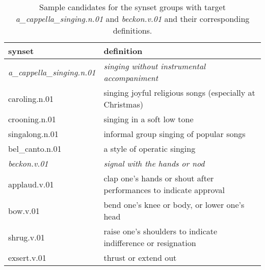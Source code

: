 \documentclass[11pt,a4paper]{article}
\begin{document}
\begin{table*}
    \centering
    \begin{tabular}{l|l}
    \hline
    \textbf{synset} & \textbf{definition} \\ \hline
    \emph{a\_cappella\_singing.n.01} & \emph{singing without instrumental accompaniment} \\
     caroling.n.01 & singing joyful religious songs (especially at Christmas) \\
     crooning.n.01 & singing in a soft low tone \\
     singalong.n.01 & informal group singing of popular songs \\
     bel\_canto.n.01 & a style of operatic singing \\ \hline
     \emph{beckon.v.01} & \emph{signal with the hands or nod} \\
     applaud.v.01 & clap one's hands or shout after performances to indicate approval \\
     bow.v.01 & bend one's knee or body, or lower one's head \\
     shrug.v.01 & raise one's shoulders to indicate indifference or resignation \\
     exsert.v.01 & thrust or extend out \\ \hline

    \end{tabular}
    \caption{Sample candidates for the synset groups with target \emph{a\_cappella\_singing.n.01} and \emph{beckon.v.01} and their corresponding definitions.} 
    \label{tab:dataset_samples}
\end{table*}
\end{document}
